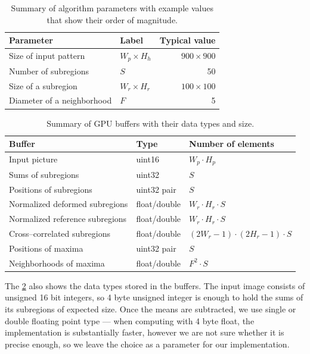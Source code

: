 \begin{table}[]
	\centering
	\begin{tabular}{@{}llr@{}}
		\toprule
		Parameter                  & Label            &    Typical value \\ \midrule
		Size of input pattern      & $W_p \times H_h$ & $900 \times 900$ \\
		Number of subregions       & $S$              &               50 \\
		Size of a subregion        & $W_r \times H_r$ & $100 \times 100$ \\
		Diameter of a neighborhood & $F$              &                5 \\ \bottomrule
	\end{tabular}
	\caption{Summary of algorithm parameters with example values that show their order of magnitude.}
	\label{params}
\end{table}

\begin{table}[]
	\begin{tabular}{@{}lll@{}}
		\toprule
		Buffer                          & Type         & Number of elements             \\ \midrule
		Input picture                   & uint16       & $W_p \cdot H_p$                \\
		Sums of subregions              & uint32       & $S$                            \\
		Positions of subregions         & uint32 pair  & $S$                            \\
		Normalized deformed subregions  & float/double & $W_r \cdot H_r \cdot S$        \\
		Normalized reference subregions & float/double & $W_r \cdot H_r \cdot S$        \\
		Cross--correlated subregions    & float/double & $(2W_r-1)\cdot(2H_r-1)\cdot S$ \\
		Positions of maxima             & uint32 pair  & $S$                            \\
		Neighborhoods of maxima         & float/double & $F^2 \cdot S $                 \\ \bottomrule
	\end{tabular}
	\caption{Summary of GPU buffers with their data types and size.}
	\label{buftypes}
\end{table}

The \cref{buftypes} also shows the data types stored in the buffers. The input image consists of unsigned 16 bit integers, so 4 byte unsigned integer is enough to hold the sums of its subregions of expected size. Once the means are subtracted, we use single or double floating point type --- when computing with 4 byte float, the implementation is substantially faster, however we are not sure whether it is precise enough, so we leave the choice as a parameter for our implementation.

